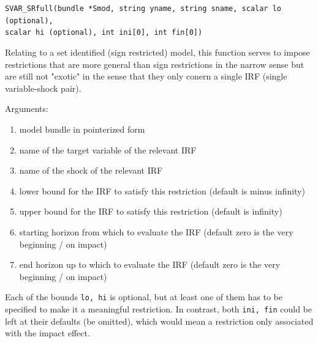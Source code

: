 \documentclass[a4paper,10pt]{article}
\newenvironment{funcdoc}[1]
{\noindent\hrulefill\newline\nopagebreak\texttt{#1}%
\nopagebreak\par\noindent\hrulefill%
\nopagebreak\par\nopagebreak\smallskip\nopagebreak\par}
{\bigskip}
\begin{document}
\begin{funcdoc}{SVAR\_SRfull(bundle *Smod, string yname, string sname, scalar lo (optional),\\
  scalar hi (optional), int ini[0], int fin[0])}
  
  Relating to a set identified (sign restricted) model, this function serves to impose restrictions that
  are more general than sign restrictions in the narrow sense but are still not "exotic" in the 
  sense that they only conern a single IRF (single variable-shock pair).
  
  Arguments:
 \begin{enumerate}
 \item model bundle in pointerized form
 \item name of the target variable of the relevant IRF
 \item name of the shock of the relevant IRF
 \item lower bound for the IRF to satisfy this restriction (default is minus infinity)
 \item upper bound for the IRF to satisfy this restriction (default is infinity)
 \item starting horizon from which to evaluate the IRF (default zero is the very beginning / on impact)
 \item end horizon up to which to evaluate the IRF (default zero is the very beginning / on impact)
  \end{enumerate}
  Each of the bounds \texttt{lo, hi} is optional, but at least one of them has to be specified
  to make it a meaningful restriction. In contrast, both \texttt{ini, fin} could be left at their defaults 
  (be omitted), which would mean a restriction only associated with the impact effect.
  \end{funcdoc}
\end{document}
